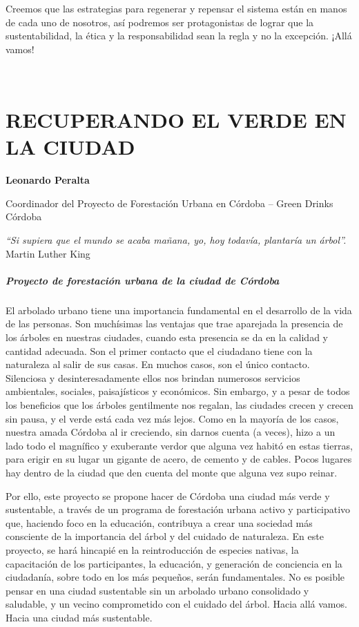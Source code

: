 \documentclass[
]{article}
\begin{document}
Creemos que las estrategias para regenerar y repensar el sistema están
en manos de cada uno de nosotros, así podremos ser protagonistas de
lograr que la sustentabilidad, la ética y la responsabilidad sean la
regla y no la excepción. ¡Allá vamos!

\textbf{\\
} \cleardoublepage

\hypertarget{recuperando-el-verde-en-la-ciudad}{%
\section{RECUPERANDO EL VERDE EN LA
CIUDAD}\label{recuperando-el-verde-en-la-ciudad}}

\textbf{Leonardo Peralta}

Coordinador del Proyecto de Forestación Urbana en Córdoba -- Green
Drinks Córdoba

\emph{``Si supiera que el mundo se acaba mañana, yo, hoy todavía,
plantaría un árbol''.} Martin Luther King

\hypertarget{proyecto-de-forestaciuxf3n-urbana-de-la-ciudad-de-cuxf3rdoba}{%
\subparagraph{Proyecto de forestación urbana de la ciudad de
Córdoba}\label{proyecto-de-forestaciuxf3n-urbana-de-la-ciudad-de-cuxf3rdoba}}

El arbolado urbano tiene una importancia fundamental en el desarrollo de
la vida de las personas. Son muchísimas las ventajas que trae aparejada
la presencia de los árboles en nuestras ciudades, cuando esta presencia
se da en la calidad y cantidad adecuada. Son el primer contacto que el
ciudadano tiene con la naturaleza al salir de sus casas. En muchos
casos, son el único contacto. Silenciosa y desinteresadamente ellos nos
brindan numerosos servicios ambientales, sociales, paisajísticos y
económicos. Sin embargo, y a pesar de todos los beneficios que los
árboles gentilmente nos regalan, las ciudades crecen y crecen sin pausa,
y el verde está cada vez más lejos. Como en la mayoría de los casos,
nuestra amada Córdoba al ir creciendo, sin darnos cuenta (a veces), hizo
a un lado todo el magnífico y exuberante verdor que alguna vez habitó en
estas tierras, para erigir en su lugar un gigante de acero, de cemento y
de cables. Pocos lugares hay dentro de la ciudad que den cuenta del
monte que alguna vez supo reinar.

Por ello, este proyecto se propone hacer de Córdoba una ciudad más verde
y sustentable, a través de un programa de forestación urbana activo y
participativo que, haciendo foco en la educación, contribuya a crear una
sociedad más consciente de la importancia del árbol y del cuidado de
naturaleza. En este proyecto, se hará hincapié en la reintroducción de
especies nativas, la capacitación de los participantes, la educación, y
generación de conciencia en la ciudadanía, sobre todo en los más
pequeños, serán fundamentales. No es posible pensar en una ciudad
sustentable sin un arbolado urbano consolidado y saludable, y un vecino
comprometido con el cuidado del árbol. Hacia allá vamos. Hacia una
ciudad más sustentable.
\end{document}
